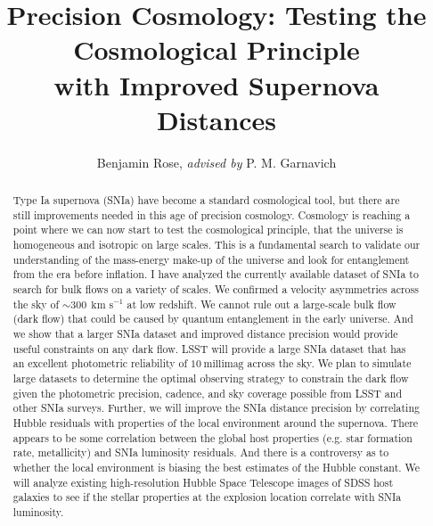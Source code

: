\documentclass[apj, iop]{emulateapj}
\newcommand{\sn}{SNIa}
\newcommand{\kms}{\ensuremath{~\text{km s}^{-1}}}
\begin{document}
\title{Precision Cosmology: Testing the Cosmological Principle \\with Improved Supernova Distances}

\author{Benjamin Rose, {\it advised by} P. M. Garnavich}


\begin{abstract} 

Type Ia supernova (\sn{}) have become a standard cosmological tool, but there
are still improvements needed in this age of precision cosmology. Cosmology is
reaching a point where we can now start to test the cosmological principle, that
the universe is homogeneous and isotropic on large scales. This is a fundamental
search to validate our understanding of the mass-energy make-up of the universe
and look for entanglement from the era before inflation. I have analyzed the
currently available dataset of \sn{} to search for bulk flows on a variety of
scales. We confirmed a  velocity asymmetries across the sky of $\sim 300~\kms{}$
at low redshift. We cannot rule out a large-scale bulk flow (dark flow) that
could be caused by quantum entanglement in the early universe. And we show that
a larger \sn{} dataset and improved distance precision would provide useful
constraints on any dark flow. LSST will provide a large \sn{} dataset that has
an excellent photometric reliability of $10~\text{millimag}$ across the sky. We plan to
simulate large datasets to determine the optimal observing strategy to constrain
the dark flow given the photometric precision, cadence, and sky coverage
possible from LSST and other \sn{} surveys. Further, we will improve the \sn{}
distance precision by correlating Hubble residuals with properties of the local
environment around the supernova. There appears to be some correlation between
the global host properties (e.g. star formation rate, metallicity) and \sn{}
luminosity residuals. And there is a controversy as to whether the local
environment is biasing the best estimates of the Hubble constant. We will
analyze existing high-resolution Hubble Space Telescope images of SDSS host
galaxies to see if the stellar properties at the explosion location correlate
with \sn{} luminosity.

\end{abstract}
\end{document}

